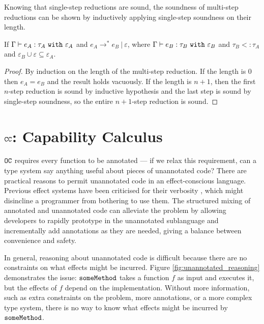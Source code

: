 Knowing that single-step reductions are sound, the soundness of multi-step reductions can be shown by inductively applying single-step soundness on their length.

\begin{theorem}
If $ \Gamma \vdash  e_A:  \tau_A~\mathtt{with}~ \varepsilon_A$ and $e_A \longrightarrow^{*} e_B~|~\varepsilon$, where $\Gamma \vdash e_B: \tau_B~\mathtt{with}~ \varepsilon_B$ and $ \tau_B <: \tau_A$ and $\varepsilon_B \cup \varepsilon \subseteq \varepsilon_A$.
\end{theorem}

\begin{proof} By induction on the length of the multi-step reduction. If the length is 0 then $e_A = e_B$ and the result holds vacuously. If the length is $n+1$, then the first $n$-step reduction is sound by inductive hypothesis and the last step is sound by single-step soundness, so the entire $n+1$-step reduction is sound.
\end{proof}






\section{$\mathtt{CC}$: Capability Calculus}

$\mathtt{OC}$ requires every function to be annotated --- if we relax this requirement, can a type system say anything useful about pieces of unannotated code? There are practical reasons to permit unannotated code in an effect-conscious language. Previous effect systems have been criticised for their verbosity \cite{rytz2012}, which might disincline a programmer from bothering to use them. The structured mixing of annotated and unannotated code can alleviate the problem by allowing developers to rapidly prototype in the unannotated sublanguage and incrementally add annotations as they are needed, giving a balance between convenience and safety.

In general, reasoning about unannotated code is difficult because there are no constraints on what effects might be incurred. Figure \ref{fig:unannotated_reasoning} demonstrates the issue: $\mathtt{someMethod}$ takes a function $f$ as input and executes it, but the effects of $f$ depend on the implementation. Without more information, such as extra constraints on the problem, more annotations, or a more complex type system, there is no way to know what effects might be incurred by $\mathtt{someMethod}$.

